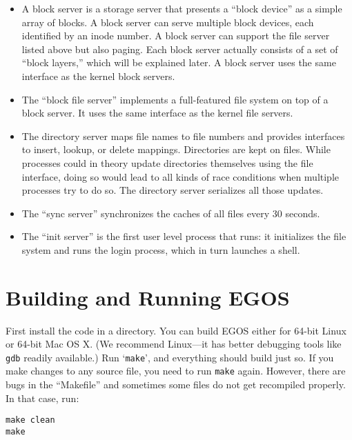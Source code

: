 \documentclass{article}
\begin{document}
\begin{itemize}
\item A block server is a storage server that presents a ``block device''
as a simple array of blocks.  A block server can serve multiple block
devices, each identified by an inode number.  A block server can support
the file server listed above but also paging.
Each block server actually consists of a set of ``block layers,'' which
will be explained later.  A block server uses the same interface as the
kernel block servers.

\item The ``block file server'' implements a full-featured file system on top of
a block server.  It uses the same interface as the kernel file servers.

\item The directory server maps
file names to file numbers and provides interfaces to insert, lookup,
or delete mappings.  Directories are kept on files.  While processes
could in theory update directories themselves using the file interface,
doing so would lead to all kinds of race conditions when multiple
processes try to do so.  The directory server serializes all those
updates.

\item The ``sync server'' synchronizes the caches of all files every 30 seconds.

\item The ``init server'' is the first user level process that runs: it
initializes the file system and runs the login process, which in turn
launches a shell.
\end{itemize}

\section{Building and Running EGOS}

First install the code in a directory.  You can build EGOS either for
64-bit Linux or 64-bit Mac OS X.
(We recommend Linux---it has better debugging tools like \texttt{gdb}
readily available.)
Run `\texttt{make}', and everything should build just so.
If you make changes to any source file, you need to run \texttt{make} again.
However, there are bugs in the ``Makefile'' and sometimes some files do
not get recompiled properly.  In that case, run:
\begin{verbatim}
make clean
make
\end{verbatim}
\end{document}
